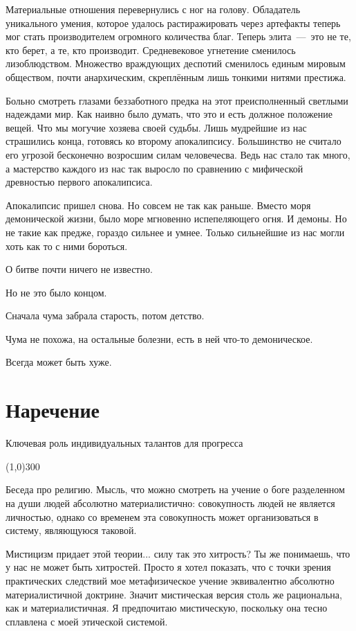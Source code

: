 \documentclass[12pt,a4paper]{article}
\newcommand{\sep}{
	\begin{center}
		\line(1,0){300}
	\end{center}
}
\begin{document}
Материальные отношения перевернулись с ног на голову. Обладатель уникального умения, которое удалось растиражировать через артефакты теперь мог стать производителем огромного количества благ. Теперь элита~---~это не те, кто берет, а те, кто производит. Средневековое угнетение сменилось лизоблюдством. Множество враждующих деспотий сменилось единым мировым обществом, почти анархическим, скреплённым лишь тонкими нитями престижа.

Больно смотреть глазами беззаботного предка на этот преисполненный светлыми надеждами мир. Как наивно было думать, что это и есть должное положение вещей. Что мы могучие хозяева своей судьбы. Лишь мудрейшие из нас страшились конца, готовясь ко второму апокалипсису. Большинство не считало его угрозой бесконечно возросшим силам человечесва. Ведь нас стало так много, а мастерство каждого из нас так выросло по сравнению с мифической древностью первого апокалипсиса.

Апокалипсис пришел снова. Но совсем не так как раньше. Вместо моря демонической жизни, было море мгновенно испепеляющего огня. И демоны. Но не такие как предже, гораздо сильнее и умнее. Только сильнейшие из нас могли хоть как то с ними бороться.


О битве почти ничего не известно. 

Но не это было концом.

Сначала чума забрала старость, потом детство.

Чума не похожа, на остальные болезни, есть в ней что-то демоническое.

Всегда может быть хуже.

\section*{Наречение}
Ключевая роль индивидуальных талантов для прогресса

\sep

Беседа про религию. Мысль, что можно смотреть на учение о боге разделенном на души людей абсолютно материалистично: совокупность людей не является личностью, однако со временем эта совокупность может организоваться в систему, являющуюся таковой.

Мистицизм придает этой теории... силу
так это хитрость?
Ты же понимаешь, что у нас не может быть хитростей. Просто я хотел показать, что с точки зрения практических следствий мое метафизическое учение эквивалентно абсолютно материалистичной доктрине. Значит мистическая версия столь же рациональна, как и материалистичная. Я предпочитаю мистическую, поскольку она тесно сплавлена с моей этической системой.
\end{document}
